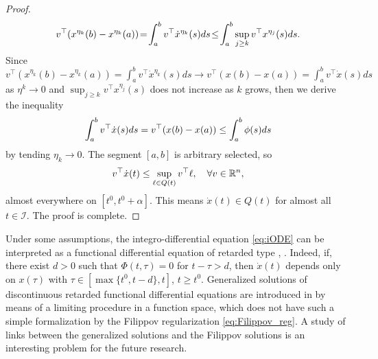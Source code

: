 \documentclass{article}
\newcommand{\R}{\mathbb{R}}
\begin{document}
\begin{proof}
\[
v^{\top}(x^{\eta_k}(b)-x^{\eta_k}(a))\!=\!\int^b_a v^{\top} \dot x^{\eta_k}(s) ds\!\leq\! \int^b_a \sup\limits_{j\geq k}v^{\top} x^{\eta_j}(s) ds.\vspace{-1mm}
\]
Since {$v^{\top}(x^{\eta_k}(b)-x^{\eta_k}(a))=\int^b_a v^{\top} \dot x^{\eta_k}(s) ds \to v^{\top}(x(b)-x(a))=\int^b_a v^{\top} \dot x(s) ds$ as $\eta^k\to 0$  and }$\sup_{j\geq k}v^{\top} x^{\eta_j}(s)$ does not increase as $k$ grows, then {we derive the inequality } \vspace{-1mm}
\[
\int^b_a v^{\top} \dot x(s) ds=v^{\top}(x(b)-x(a))\leq \int^b_a \phi(s) ds \vspace{-1mm}
\]
{by tending $\eta_k\!\to\! 0$.}
The segment $[a,b]$ is arbitrary selected, so\vspace{-1mm}
\[
v^{\top} \dot x(t)\le\sup_{\ell \in Q(t)}v^{\top}\ell, \quad \forall v\in \R^n,\vspace{-1mm}
\]
almost everywhere on $[t^0,t^0+\alpha]$. This  means $\dot x(t)\in Q(t)$ for almost all $t\in \mathcal{I}$. The proof is complete.
\end{proof}

Under some assumptions,  the integro-differential equation \eqref{eq:iODE} can be interpreted as a functional differential equation of retarded type  \cite{Hale1977:Book}, \cite{Fridman2014:Book}.
 Indeed, if, there exist $d>0$ such that $\Phi(t,\tau)=0$ for $t-\tau>d$, then
	$\dot x(t)$ depends only on $x(\tau)$ with $\tau\in [\max\{t^0, t-d\},t]$, $t\geq t^0$.
	Generalized solutions of  discontinuous retarded functional differential equations are introduced in  \cite[page 58]{KolmanovskiiMyshkis1992:Book} by means of a limiting procedure in a function space, which does not have such a simple formalization by the Filippov regularization \eqref{eq:Filippov_reg}. A study of links between the generalized solutions and the Filippov solutions is an interesting problem for the future research. 	
\end{document}
